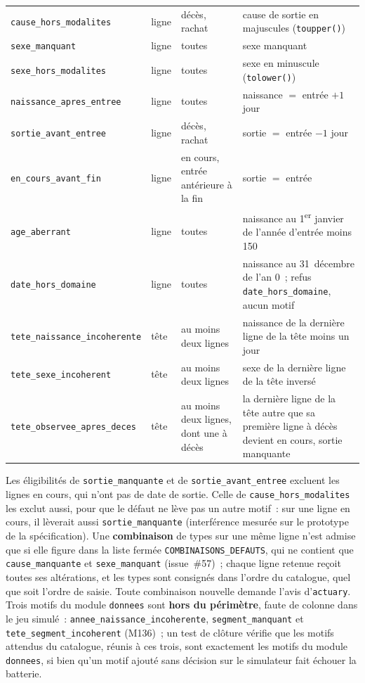 \documentclass[a4paper,11pt]{article}
\newcommand{\code}[1]{\texttt{\small #1}}
\begin{document}
{\begin{longtable}{@{}p{4.9cm}p{0.9cm}p{2.5cm}p{5.9cm}@{}}
\code{cause\_hors\_modalites} & ligne & décès, rachat & cause de sortie en majuscules (\code{toupper()}) \\
\code{sexe\_manquant} & ligne & toutes & sexe manquant \\
\code{sexe\_hors\_modalites} & ligne & toutes & sexe en minuscule (\code{tolower()}) \\
\code{naissance\_apres\_entree} & ligne & toutes & naissance $=$ entrée $+ 1$ jour \\
\code{sortie\_avant\_entree} & ligne & décès, rachat & sortie $=$ entrée $- 1$ jour \\
\code{en\_cours\_avant\_fin} & ligne & en cours, entrée antérieure à la fin & sortie $=$ entrée \\
\code{age\_aberrant} & ligne & toutes & naissance au 1\textsuperscript{er} janvier de l'année d'entrée moins 150 \\
\code{date\_hors\_domaine} & ligne & toutes & naissance au 31~décembre de l'an 0~; refus \code{date\_hors\_domaine}, aucun motif \\
\code{tete\_naissance\_incoherente} & tête & au moins deux lignes & naissance de la dernière ligne de la tête moins un jour \\
\code{tete\_sexe\_incoherent} & tête & au moins deux lignes & sexe de la dernière ligne de la tête inversé \\
\code{tete\_observee\_apres\_deces} & tête & au moins deux lignes, dont une à décès & la dernière ligne de la tête autre que sa première ligne à décès devient en cours, sortie manquante \\
\end{longtable}
}

{\sloppy{} \noindent
Les éligibilités de \code{sortie\_manquante} et de
\code{sortie\_avant\_entree} excluent les lignes en cours, qui n'ont pas de
date de sortie. Celle de \code{cause\_hors\_modalites} les exclut aussi,
pour que le défaut ne lève pas un autre motif~: sur une ligne en cours, il
lèverait aussi \code{sortie\_manquante} (interférence mesurée sur le
prototype de la spécification).
Une \textbf{combinaison} de types sur une même ligne n'est admise que si
elle figure dans la liste fermée \code{COMBINAISONS\_DEFAUTS}, qui ne
contient que \code{cause\_manquante} et \code{sexe\_manquant} (issue~\#57)~;
chaque ligne retenue reçoit toutes ses altérations, et les types sont
consignés dans l'ordre du catalogue, quel que soit l'ordre de saisie. Toute
combinaison nouvelle demande l'avis d'\code{actuary}. Trois motifs du module
\code{donnees} sont \textbf{hors du périmètre}, faute de colonne dans le jeu
simulé~: \code{annee\_naissance\_incoherente}, \code{segment\_manquant} et
\code{tete\_segment\_incoherent} (M136)~; un test de clôture vérifie que les
motifs attendus du catalogue, réunis à ces trois, sont exactement les motifs
du module \code{donnees}, si bien qu'un motif ajouté sans décision sur le
simulateur fait échouer la batterie.\par}
\end{document}
